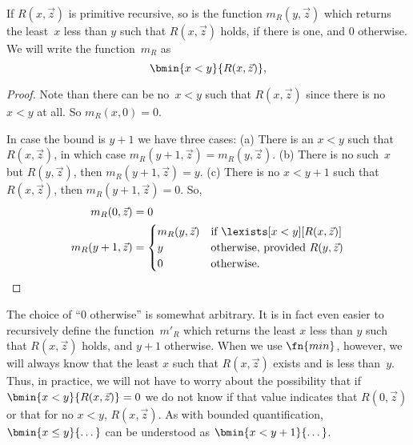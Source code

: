 \documentclass[../../include/open-logic-section]{subfiles}
\begin{document}


\begin{prop}
If $R(x, \vec z)$ is primitive recursive, so is the function $m_R(y,
\vec{z})$ which returns the least~$x$ less than $y$ such that
$R(x,\vec{z})$ holds, if there is one, and 0 otherwise.  We will write
the function~$m_R$ as
\[
\bmin{x < y}{R(x, \vec{z})},
\]
\end{prop}

\begin{proof}
Note than there can be no~$x < y$ such that $R(x, \vec{z})$ since
there is no $x < y$ at all.  So $m_R(x, 0) = 0$.

In case the bound is $y + 1$ we have three cases: (a) There is an $x <
y$ such that $R(x, \vec{z})$, in which case $m_R(y+1, \vec{z}) =
m_R(y, \vec{z})$. (b) There is no such~$x$ but $R(y, \vec{z})$, then
$m_R(y+1, \vec{z}) = y$. (c) There is no $x < y+1$ such that $R(x,
\vec{z})$, then $m_R(y+1,\vec{z}) = 0$. So,
\begin{align*}
m_R(0, \vec{z}) & = 0\\
m_R(y+1, \vec{z}) & = 
\begin{cases}
m_R(y, \vec{z}) & \text{if $\lexists[x < y][R(x, \vec{z})]$} \\
y & \text{otherwise, provided $R(y, \vec{z})$}\\
0 & \text{otherwise.}
\end{cases}
\end{align*}
\end{proof}

\begin{explain}
The choice of ``$0$ otherwise'' is somewhat arbitrary. It is in fact
even easier to recursively define the function~$m'_R$ which returns
the least $x$ less than $y$ such that $R(x,\vec z)$ holds, and $y+1$
otherwise.  When we use $\fn{min}$, however, we will always know that
the least $x$ such that $R(x, \vec z)$ exists and is less
than~$y$. Thus, in practice, we will not have to worry about the
possibility that if $\bmin{x<y}{R(x, \vec{z})} = 0$ we do not know if that
value indicates that $R(0, \vec z)$ or that for no $x < y$, $R(x, \vec
z)$. As with bounded quantification, $\bmin{x \leq y}{\dots}$
can be understood as $\bmin{x < y + 1}{\dots}$.
\end{explain}
\end{document}
